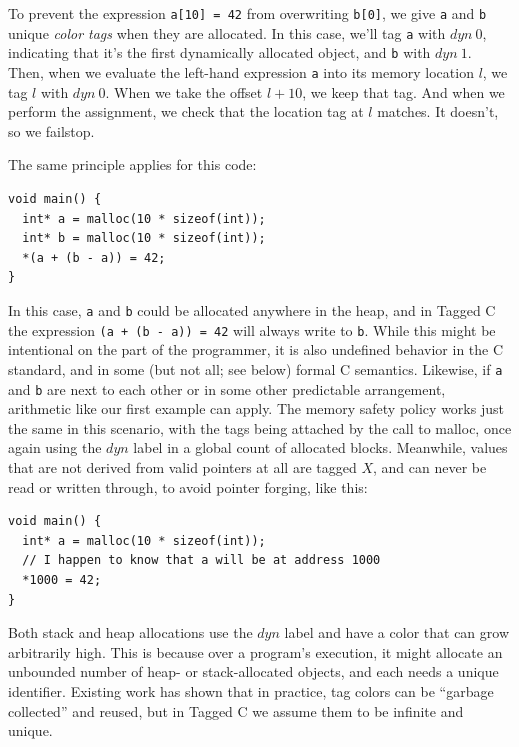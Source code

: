 \documentclass[acmsmall,review,anonymous]{acmart}\settopmatter{printfolios=true,printccs=false,printacmref=false}
\begin{document}
To prevent the expression {\tt a[10] = 42} from overwriting {\tt b[0]}, we give {\tt a} and {\tt b}
unique {\it color tags} when they are allocated. In this case, we'll tag {\tt a} with \(\mathit{dyn ~ 0}\),
indicating that it's the first dynamically allocated object, and {\tt b} with \(\mathit{dyn ~ 1}\).
Then, when we evaluate the left-hand expression {\tt a} into its memory location \(l\), we tag
\(l\) with \(\mathit{dyn ~ 0}\). When we take the offset \(l + 10\), we keep that tag. And when we
perform the assignment, we check that the location tag at \(l\) matches. It doesn't, so we failstop.

The same principle applies for this code:

\vspace{\abovedisplayskip}
\begin{verbatim}
void main() {
  int* a = malloc(10 * sizeof(int));
  int* b = malloc(10 * sizeof(int));
  *(a + (b - a)) = 42;
}
\end{verbatim}
\vspace{\belowdisplayskip}

In this case, {\tt a} and {\tt b} could be allocated anywhere in the heap, and in Tagged C
the expression {\tt *(a + (b - a)) = 42} will always write to {\tt *b}. While this might be intentional
on the part of the programmer, it is also undefined behavior in the C standard, and in some
(but not all; see below) formal C semantics. Likewise, if {\tt a} and {\tt b} are next to each other
or in some other predictable arrangement, arithmetic like our first example can apply.
The memory safety policy works just the same in this scenario, with the tags being attached
by the call to malloc, once again using the \(\mathit{dyn}\) label in a global count of allocated blocks.
Meanwhile, values that are not derived from valid pointers at all are tagged \(X\), and can never
be read or written through, to avoid pointer forging, like this:

\vspace{\abovedisplayskip}
\begin{verbatim}
void main() {
  int* a = malloc(10 * sizeof(int));
  // I happen to know that a will be at address 1000
  *1000 = 42;
}
\end{verbatim}
\vspace{\belowdisplayskip}

Both stack and heap allocations use the \(\mathit{dyn}\) label and have a color that can grow arbitrarily
high. This is because over a program's execution, it might allocate an unbounded number of heap- or
stack-allocated objects, and each needs a unique identifier. Existing work has shown that in practice,
tag colors can be ``garbage collected'' and reused, but in Tagged C we assume them to be infinite and unique.
\end{document}
